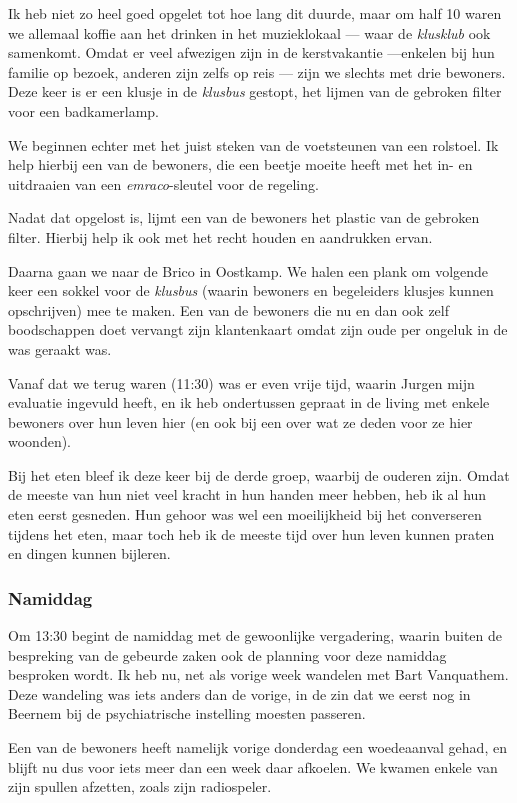 \documentclass[a4paper,12pt]{article}
\begin{document}
Ik heb niet zo heel goed opgelet tot hoe lang dit duurde, maar om half 10 waren we allemaal koffie aan het drinken in het muzieklokaal --- waar de \emph{klusklub} ook samenkomt. Omdat er veel afwezigen zijn in de kerstvakantie ---enkelen bij hun familie op bezoek, anderen zijn zelfs op reis --- zijn we slechts met drie bewoners. Deze keer is er een klusje in de \emph{klusbus} gestopt, het lijmen van de gebroken filter voor een badkamerlamp.

We beginnen echter met het juist steken van de voetsteunen van een rolstoel. Ik help hierbij een van de bewoners, die een beetje moeite heeft met het in- en uitdraaien van een \emph{emraco}-sleutel voor de regeling.

Nadat dat opgelost is, lijmt een van de bewoners het plastic van de gebroken filter. Hierbij help ik ook met het recht houden en aandrukken ervan.

Daarna gaan we naar de Brico in Oostkamp. We halen een plank om volgende keer een sokkel voor de \emph{klusbus} (waarin bewoners en begeleiders klusjes kunnen opschrijven) mee te maken. Een van de bewoners die nu en dan ook zelf boodschappen doet vervangt zijn klantenkaart omdat zijn oude per ongeluk in de was geraakt was.

Vanaf dat we terug waren (11:30) was er even vrije tijd, waarin Jurgen mijn evaluatie ingevuld heeft, en ik heb ondertussen gepraat in de living met enkele bewoners over hun leven hier (en ook bij een over wat ze deden voor ze hier woonden).

Bij het eten bleef ik deze keer bij de derde groep, waarbij de ouderen zijn. Omdat de meeste van hun niet veel kracht in hun handen meer hebben, heb ik al hun eten eerst gesneden. Hun gehoor was wel een moeilijkheid bij het converseren tijdens het eten, maar toch heb ik de meeste tijd over hun leven kunnen praten en dingen kunnen bijleren.

\subsubsection{Namiddag}
Om 13:30 begint de namiddag met de gewoonlijke vergadering, waarin buiten de bespreking van de gebeurde zaken ook de planning voor deze namiddag besproken wordt. Ik heb nu, net als vorige week wandelen met Bart Vanquathem. Deze wandeling was iets anders dan de vorige, in de zin dat we eerst nog in Beernem bij de psychiatrische instelling moesten passeren.

Een van de bewoners heeft namelijk vorige donderdag een woedeaanval gehad, en blijft nu dus voor iets meer dan een week daar afkoelen. We kwamen enkele van zijn spullen afzetten, zoals zijn radiospeler.
\end{document}
